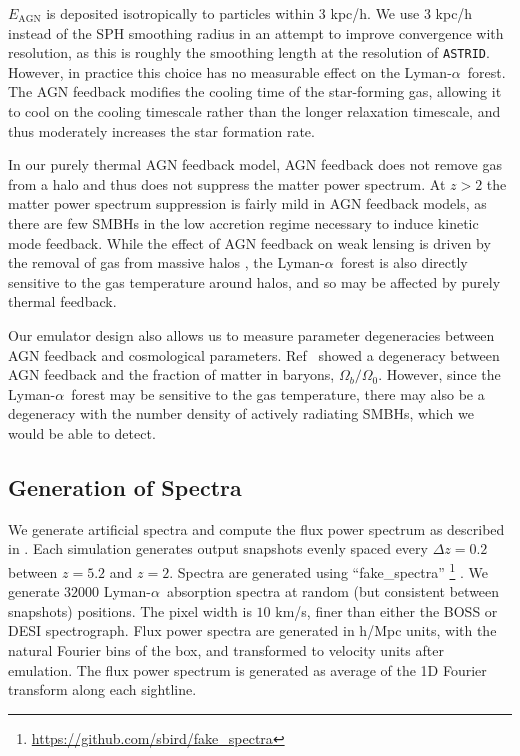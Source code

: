 \documentclass[a4paper,11pt]{article}
\newcommand{\Lya}{Lyman-$\alpha$}
\newcommand{\astrid}{\texttt{ASTRID}}
\begin{document}
$E_\mathrm{AGN}$ is deposited isotropically to particles within $3$ kpc/h. We use $3$ kpc/h instead of the SPH smoothing radius in an attempt to improve convergence with resolution, as this is roughly the smoothing length at the resolution of \astrid. However, in practice this choice has no measurable effect on the \Lya~forest. The AGN feedback modifies the cooling time of the star-forming gas, allowing it to cool on the cooling timescale rather than the longer relaxation timescale, and thus moderately increases the star formation rate.

In our purely thermal AGN feedback model, AGN feedback does not remove gas from a halo and thus does not suppress the matter power spectrum. At $z > 2$ the matter power spectrum suppression is fairly mild in AGN feedback models, as there are few SMBHs in the low accretion regime necessary to induce kinetic mode feedback. While the effect of AGN feedback on weak lensing is driven by the removal of gas from massive halos \cite[e.g.~][]{Giri:2021}, the \Lya~forest is also directly sensitive to the gas temperature around halos, and so may be affected by purely thermal feedback.

Our emulator design also allows us to measure parameter degeneracies between AGN feedback and cosmological parameters. Ref~\cite{Schneider:2015} showed a degeneracy between AGN feedback and the fraction of matter in baryons, $\Omega_b / \Omega_0$. However, since the \Lya~forest may be sensitive to the gas temperature, there may also be a degeneracy with the number density of actively radiating SMBHs, which we would be able to detect.


\subsection{Generation of Spectra}
\label{sec:spectra}

We generate artificial spectra and compute the flux power spectrum as described in \cite{Bird:2019}. Each simulation generates output snapshots evenly spaced every $\Delta z = 0.2$ between $z = 5.2$ and $z = 2$. Spectra are generated using ``fake\_spectra'' \footnote{\url{https://github.com/sbird/fake_spectra}} \cite{FSFE:2017}. We generate $32000$
\Lya~absorption spectra at random (but consistent between snapshots) positions. The
pixel width is $10$ km/s, finer than either the BOSS or DESI spectrograph. Flux power spectra are generated in h/Mpc units, with the natural Fourier bins of the box, and transformed to velocity units after emulation. The flux power spectrum is generated as average of the 1D Fourier transform along each sightline.
\end{document}
